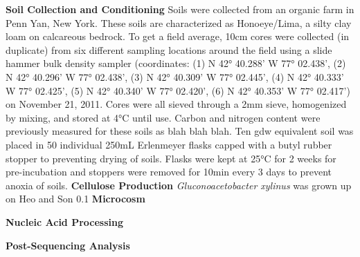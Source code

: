 \textbf{Soil Collection and Conditioning}
Soils were collected from an organic farm in Penn Yan, New York.  These soils are characterized as Honoeye/Lima, a silty clay loam on calcareous bedrock.  To get a field average, 10cm cores were collected (in duplicate) from six different sampling locations around the field using a slide hammer bulk density sampler (coordinates: (1) N 42° 40.288’ W 77° 02.438’, (2) N 42° 40.296’ W 77° 02.438’, (3) N 42° 40.309’ W 77° 02.445’, (4) N 42° 40.333’ W 77° 02.425’, (5) N 42° 40.340’ W 77° 02.420’, (6) N 42° 40.353’ W 77° 02.417’) on November 21, 2011.   Cores were all sieved through a 2mm sieve, homogenized by mixing, and stored at 4°C until use.  Carbon and nitrogen content were previously measured for these soils as blah blah blah.  Ten gdw equivalent soil was placed in 50 individual 250mL Erlenmeyer flasks capped with a butyl rubber stopper to preventing drying of soils.  Flasks were kept at 25°C for 2 weeks for pre-incubation and stoppers were removed for 10min every 3 days to prevent anoxia of soils.   
\textbf{Cellulose Production}
\textit{Gluconoacetobacter xylinus} was grown up on Heo and Son 0.1%
\textbf{Microcosm}

\textbf{Nucleic Acid Processing}

\textbf{Post-Sequencing Analysis}